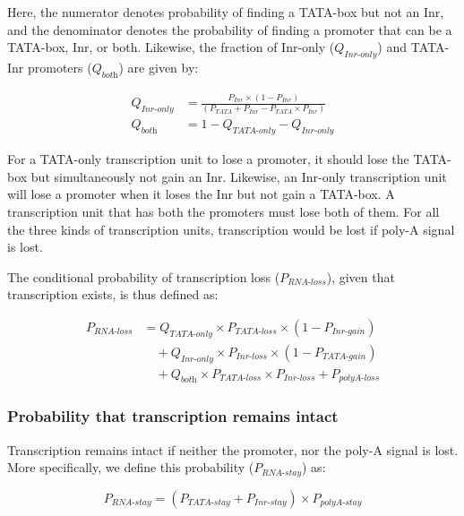 \documentclass[12pt,a4paper]{article}
\begin{document}
\vspace{1ex}

Here, the numerator denotes probability of finding a TATA-box but not an Inr, and the denominator denotes the probability of finding a promoter that can be a TATA-box, Inr, or both. Likewise, the fraction of Inr-only ($Q_\textit{Inr-only}$) and TATA-Inr promoters ($Q_\textit{both}$) are given by:

\begin{align*}
Q_\textit{Inr-only} & = \frac{P_\textit{Inr}\times(1 - P_\textit{Inr})}{(P_\textit{TATA} + P_\textit{Inr} - P_\textit{TATA}\times P_\textit{Inr})} \\[1ex]
Q_\textit{both} & = 1 - Q_\textit{TATA-only} -Q_\textit{Inr-only}
\end{align*}

For a TATA-only transcription unit to lose a promoter, it should lose the TATA-box but simultaneously not gain an Inr. Likewise, an Inr-only transcription unit will lose a promoter when it loses the Inr but not gain a TATA-box. A transcription unit that has both the promoters must lose both of them. For all the three kinds of transcription units, transcription would be lost if poly-A signal is lost.

The conditional probability of transcription loss ($P_\textit{RNA-loss}$), given that transcription exists, is thus defined as:

\begin{align}
P_\textit{RNA-loss} & = Q_\textit{TATA-only} \times P_\textit{TATA-loss}\times(1-P_\textit{Inr-gain}) \nonumber\\[1pt]
 & \quad + Q_\textit{Inr-only}\times P_\textit{Inr-loss}\times(1-P_\textit{TATA-gain}) \nonumber \\[1pt]
 & \quad + Q_\textit{both}\times P_\textit{TATA-loss} \times P_\textit{Inr-loss} + P_\textit{polyA-loss}
\label{eqrnaloss}
\end{align}

\subsubsection{Probability that transcription remains intact}

Transcription remains intact if neither the promoter, nor the poly-A signal is lost. More specifically, we define this probability ($P_\textit{RNA-stay}$) as:

\begin{equation}
P_\textit{RNA-stay} = (P_\textit{TATA-stay} + P_\textit{Inr-stay}) \times P_\textit{polyA-stay}
\label{eqrnastay}
\end{equation}
\end{document}
